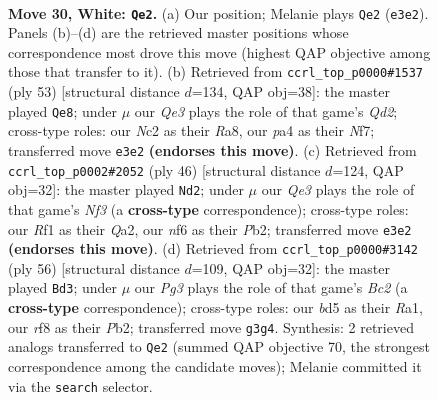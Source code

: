 \documentclass[11pt]{article}
\begin{document}
\clearpage

\begin{figure}[p]\centering
\begin{subfigure}{0.46\textwidth}\centering
\resizebox{\linewidth}{!}{%
\newchessgame
\chessboard[
  setfen={r2q1rk1/2pn1pb1/3p1n2/1P1b3p/p6P/P2BQ1P1/1PNB4/RN3RK1 w - - 0 30},
  showmover=false,
  pgfstyle=straightmove, color=movearrow, markmove={e3-e2}
]}
\caption{}
\end{subfigure}\hfill
\begin{subfigure}{0.46\textwidth}\centering
\resizebox{\linewidth}{!}{%
\newchessgame
\chessboard[
  setfen={r2r2k1/3q1nb1/2p1bnp1/2B1p2p/p3P3/P1N3NP/2P1B1P1/1R2QRK1 b - - 9 27},
  showmover=false,
  pgfstyle=straightmove, color=movearrow, markmove={d7-e8}
]}
\caption{}
\end{subfigure}
\\[4pt]
\begin{subfigure}{0.46\textwidth}\centering
\resizebox{\linewidth}{!}{%
\newchessgame
\chessboard[
  setfen={2rr2k1/1b1nbpp1/1q3n1p/p1pp4/P7/2N1PNBP/QP2BPP1/2RR2K1 w - - 0 24},
  showmover=false,
  pgfstyle=straightmove, color=movearrow, markmove={f3-d2}
]}
\caption{}
\end{subfigure}\hfill
\begin{subfigure}{0.46\textwidth}\centering
\resizebox{\linewidth}{!}{%
\newchessgame
\chessboard[
  setfen={1qr2r1k/pn1b2bp/3n1pp1/p2Pp3/4P3/R1N4P/1PBNQBP1/R6K w - - 14 29},
  showmover=false,
  pgfstyle=straightmove, color=movearrow, markmove={c2-d3}
]}
\caption{}
\end{subfigure}
\caption{\textbf{Move 30, White: \texttt{Qe2}.} (a) Our position; Melanie plays \texttt{Qe2} (\texttt{e3e2}). Panels (b)--(d) are the retrieved master positions whose correspondence most drove this move (highest QAP objective among those that transfer to it). (b) Retrieved from \texttt{ccrl\_top\_p0000\#1537} (ply 53) [structural distance $d$=134, QAP obj=38]: the master played \texttt{Qe8}; under $\mu$ our \emph{Qe3} plays the role of that game's \emph{Qd2}; cross-type roles: our \emph{N}c2 as their \emph{R}a8, our \emph{p}a4 as their \emph{N}f7; transferred move \texttt{e3e2} \textbf{(endorses this move)}. (c) Retrieved from \texttt{ccrl\_top\_p0002\#2052} (ply 46) [structural distance $d$=124, QAP obj=32]: the master played \texttt{Nd2}; under $\mu$ our \emph{Qe3} plays the role of that game's \emph{Nf3} (a \textbf{cross-type} correspondence); cross-type roles: our \emph{R}f1 as their \emph{Q}a2, our \emph{n}f6 as their \emph{P}b2; transferred move \texttt{e3e2} \textbf{(endorses this move)}. (d) Retrieved from \texttt{ccrl\_top\_p0000\#3142} (ply 56) [structural distance $d$=109, QAP obj=32]: the master played \texttt{Bd3}; under $\mu$ our \emph{Pg3} plays the role of that game's \emph{Bc2} (a \textbf{cross-type} correspondence); cross-type roles: our \emph{b}d5 as their \emph{R}a1, our \emph{r}f8 as their \emph{P}b2; transferred move \texttt{g3g4}. Synthesis: 2 retrieved analogs transferred to \texttt{Qe2} (summed QAP objective 70, the strongest correspondence among the candidate moves); Melanie committed it via the \texttt{search} selector.}
\label{fig:thought-m58}
\end{figure}
\end{document}
